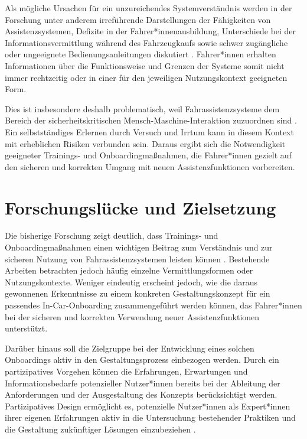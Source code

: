 Als mögliche Ursachen für ein unzureichendes Systemverständnis werden in der Forschung unter anderem irreführende Darstellungen der Fähigkeiten von Assistenzsystemen, Defizite in der Fahrer*innenausbildung, Unterschiede bei der Informationsvermittlung während des Fahrzeugkaufs sowie schwer zugängliche oder ungeeignete Bedienungsanleitungen diskutiert \cite{dixon2020autonowashing,rodak2023driver,mason2024developing,detjen2021supporting}. Fahrer*innen erhalten Informationen über die Funktionsweise und Grenzen der Systeme somit nicht immer rechtzeitig oder in einer für den jeweiligen Nutzungskontext geeigneten Form.

Dies ist insbesondere deshalb problematisch, weil Fahrassistenzsysteme dem Bereich der sicherheitskritischen Mensch-Maschine-Interaktion zuzuordnen sind \cite{Geisler_hci2021}. Ein selbstständiges Erlernen durch Versuch und Irrtum kann in diesem Kontext mit erheblichen Risiken verbunden sein. Daraus ergibt sich die Notwendigkeit geeigneter Trainings- und Onboardingmaßnahmen, die Fahrer*innen gezielt auf den sicheren und korrekten Umgang mit neuen Assistenzfunktionen vorbereiten.

\section{Forschungslücke und Zielsetzung}
\label{sec:forschungsluecke_und_zielsetzung}

Die bisherige Forschung zeigt deutlich, dass Trainings- und Onboardingmaßnahmen einen wichtigen Beitrag zum Verständnis und zur sicheren
Nutzung von Fahrassistenzsystemen leisten können \cite{detjen2021supporting,feinauer2023first,murtaza2024assessing,pongratz2026persuasive}. Bestehende Arbeiten betrachten jedoch häufig einzelne Vermittlungsformen oder Nutzungskontexte. Weniger eindeutig erscheint jedoch, wie die daraus gewonnenen
Erkenntnisse zu einem konkreten Gestaltungskonzept für ein passendes In-Car-Onboarding zusammengeführt werden können, das Fahrer*innen bei der sicheren und korrekten Verwendung neuer Assistenzfunktionen unterstützt. 

Darüber hinaus soll die Zielgruppe bei der Entwicklung eines solchen Onboardings aktiv in den Gestaltungsprozess einbezogen werden. Durch ein partizipatives Vorgehen können die Erfahrungen, Erwartungen und Informationsbedarfe potenzieller Nutzer*innen bereits bei der Ableitung der Anforderungen und der Ausgestaltung des Konzepts berücksichtigt werden. Partizipatives Design ermöglicht es, potenzielle Nutzer*innen als Expert*innen ihrer eigenen Erfahrungen aktiv in die Untersuchung bestehender Praktiken und die Gestaltung zukünftiger Lösungen einzubeziehen \cite{spinuzzi2005methodology,sanders2008cocreation}.

